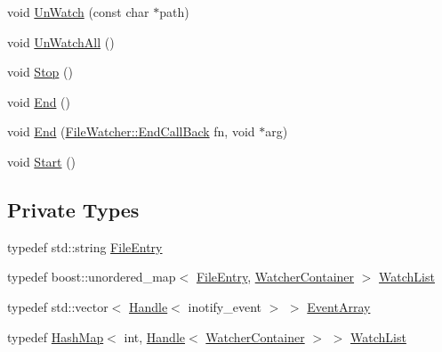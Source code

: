 \begin{DoxyCompactItemize}
\item 
void \hyperlink{classmocha_1_1_file_watcher_1_1_ptr_impl_ad0aca11b5dffced71385d0b40bf4a060}{UnWatch} (const char $\ast$path)
\item 
void \hyperlink{classmocha_1_1_file_watcher_1_1_ptr_impl_ad5bbbb2993eb3661ec94154a4fe0a448}{UnWatchAll} ()
\item 
void \hyperlink{classmocha_1_1_file_watcher_1_1_ptr_impl_adcf4783a26e4dd2ab797dbb790087012}{Stop} ()
\item 
void \hyperlink{classmocha_1_1_file_watcher_1_1_ptr_impl_ab68659e2a0445d58e1df7af1ed3280ca}{End} ()
\item 
void \hyperlink{classmocha_1_1_file_watcher_1_1_ptr_impl_ae132bbd9089fec4183743bf2f3d90113}{End} (\hyperlink{classmocha_1_1_file_watcher_af774b8dd436b9f8929506466533831b9}{FileWatcher::EndCallBack} fn, void $\ast$arg)
\item 
void \hyperlink{classmocha_1_1_file_watcher_1_1_ptr_impl_a61d2ff449e422799e8554fca888663e4}{Start} ()
\end{DoxyCompactItemize}
\subsection*{Private Types}
\begin{DoxyCompactItemize}
\item 
typedef std::string \hyperlink{classmocha_1_1_file_watcher_1_1_ptr_impl_ac8da734014593b49abf0a45f97154ac6}{FileEntry}
\item 
typedef boost::unordered\_\-map$<$ \hyperlink{classmocha_1_1_file_watcher_1_1_ptr_impl_ac8da734014593b49abf0a45f97154ac6}{FileEntry}, \hyperlink{classmocha_1_1_watcher_container}{WatcherContainer} $>$ \hyperlink{classmocha_1_1_file_watcher_1_1_ptr_impl_a0f2e431afab5a7af053ec48673cc325d}{WatchList}
\item 
typedef std::vector$<$ \hyperlink{classmocha_1_1_handle}{Handle}$<$ inotify\_\-event $>$ $>$ \hyperlink{classmocha_1_1_file_watcher_1_1_ptr_impl_a0f2e577eda4e2979add6ae59a6c42c63}{EventArray}
\item 
typedef \hyperlink{classmocha_1_1_hash_map}{HashMap}$<$ int, \hyperlink{classmocha_1_1_handle}{Handle}$<$ \hyperlink{classmocha_1_1_watcher_container}{WatcherContainer} $>$ $>$ \hyperlink{classmocha_1_1_file_watcher_1_1_ptr_impl_a978a55e79bd47e1b1d284d95d24ee61c}{WatchList}
\end{DoxyCompactItemize}
